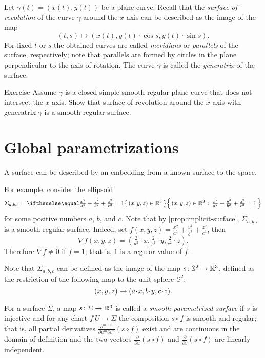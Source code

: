 Let $\gamma(t)=(x(t),y(t))$ be a plane curve.
Recall that the \emph{surface of revolution} of the curve $\gamma$ around the $x$-axis can be described as the 
image of the map 
\[(t, s)\mapsto (x(t), y(t)\cdot\cos s,y(t)\cdot\sin s).\]
For fixed $t$ or $s$ the obtained curves are called \emph{meridians} or \emph{parallels} of the surface, respectively; note that parallels are formed by circles in the plane perpendicular to the axis of rotation.
The curve $\gamma$ is called the \emph{generatrix} of the surface.

\begin{thm}{Exercise}\label{ex:revolution}
Assume $\gamma$ is a closed simple smooth regular plane curve that does not intersect the $x$-axis.
Show that surface of revolution around the $x$-axis with generatrix $\gamma$ is a smooth regular surface.
\end{thm}


\section{Global parametrizations} 
A surface can be described by an embedding from a known surface to the space.

For example, consider the ellipsoid
\[\Sigma_{a,b,c}=\set{(x,y,z)\in\RR^3}{\tfrac{x^2}{a^2}+\tfrac{y^2}{b^2}+\tfrac{z^2}{c^2}=1}\]
for some positive numbers $a$, $b$, and $c$.
Note that by \ref{prop:implicit-surface}, $\Sigma_{a,b,c}$ is a smooth regular surface.
Indeed, set $f(x,y,z)=\tfrac{x^2}{a^2}+\tfrac{y^2}{b^2}+\tfrac{z^2}{c^2}$,
then
\[\nabla f(x,y,z)=(\tfrac{2}{a^2}\cdot x,\tfrac{2}{b^2}\cdot y,\tfrac{2}{c^2}\cdot z).\]
Therefore $\nabla f\ne0$ if $f=1$; that is, $1$ is a regular value of $f$.

Note that $\Sigma_{a,b,c}$ can be defined as the image of the map $s\colon\mathbb{S}^2\to\mathbb{R}^3$, defined as the restriction of the following map to the unit sphere $\mathbb{S}^2$:
\[(x,y,z)\z\mapsto (a\cdot x, b\cdot y,c\cdot z).\]

For a surface $\Sigma$, a map $s\colon \Sigma \to \mathbb{R} ^3$ is called a 
\emph{smooth parametrized surface} if $s$ is injective and for any chart $f\:U\to \Sigma$ 
the composition $s\circ f$ is smooth and regular;
that is, all partial derivatives $\frac{\partial^{m+n}}{\partial u^m\partial v^n}(s\circ f)$ exist and are continuous in the domain of definition and the two vectors 
$\frac{\partial}{\partial u}(s\circ f)$ and $\frac{\partial}{\partial v}(s\circ f)$ are linearly independent.

